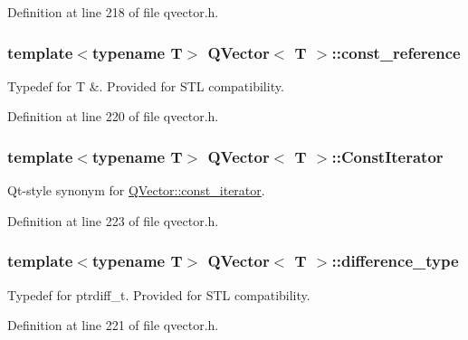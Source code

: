 Definition at line 218 of file qvector.\+h.

\subsubsection[{\texorpdfstring{const\+\_\+reference}{const_reference}}]{\setlength{\rightskip}{0pt plus 5cm}template$<$typename T$>$ {\bf Q\+Vector}$<$ T $>$\+::{\bf const\+\_\+reference}}\hypertarget{class_q_vector_a4054473292677d3bc7d901db7b3b3f20}{}\label{class_q_vector_a4054473292677d3bc7d901db7b3b3f20}
Typedef for T \&. Provided for S\+TL compatibility. 

Definition at line 220 of file qvector.\+h.

\subsubsection[{\texorpdfstring{Const\+Iterator}{ConstIterator}}]{\setlength{\rightskip}{0pt plus 5cm}template$<$typename T$>$ {\bf Q\+Vector}$<$ T $>$\+::{\bf Const\+Iterator}}\hypertarget{class_q_vector_a480cfc218d799ecba92075c848e605c6}{}\label{class_q_vector_a480cfc218d799ecba92075c848e605c6}
Qt-\/style synonym for \hyperlink{class_q_vector_a01e19bfad7fefd3e97ef197f4ed2cceb}{Q\+Vector\+::const\+\_\+iterator}. 

Definition at line 223 of file qvector.\+h.

\subsubsection[{\texorpdfstring{difference\+\_\+type}{difference_type}}]{\setlength{\rightskip}{0pt plus 5cm}template$<$typename T$>$ {\bf Q\+Vector}$<$ T $>$\+::{\bf difference\+\_\+type}}\hypertarget{class_q_vector_aaccc790d3ba04fc52580cdfc9d9290fa}{}\label{class_q_vector_aaccc790d3ba04fc52580cdfc9d9290fa}
Typedef for ptrdiff\+\_\+t. Provided for S\+TL compatibility. 

Definition at line 221 of file qvector.\+h.

